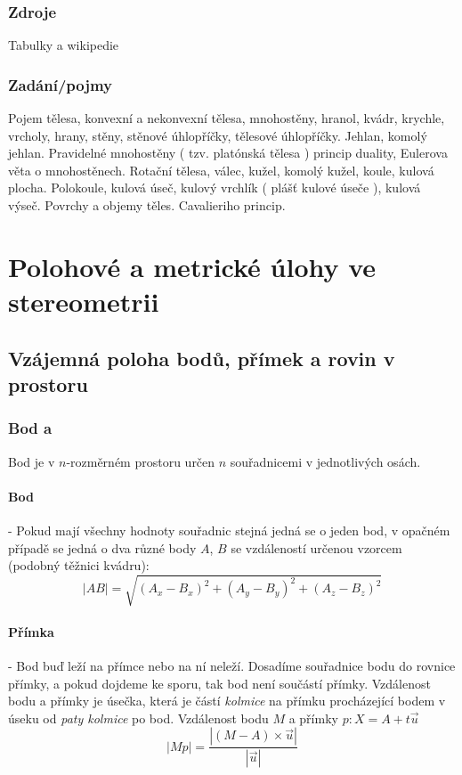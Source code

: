 \documentclass[12pt]{article}
\begin{document}
\subsubsection{Zdroje}
Tabulky a wikipedie	
\subsubsection{Zadání/pojmy}
Pojem tělesa, konvexní a nekonvexní tělesa, mnohostěny, hranol, kvádr, krychle, vrcholy, hrany, stěny, stěnové úhlopříčky, tělesové úhlopříčky. Jehlan, komolý jehlan. Pravidelné mnohostěny ( tzv. platónská tělesa ) princip duality, Eulerova věta o mnohostěnech. Rotační tělesa, válec, kužel, komolý kužel, koule, kulová plocha. Polokoule, kulová úseč, kulový vrchlík ( plášť kulové úseče ), kulová výseč. Povrchy a objemy těles. Cavalieriho princip.

\section{Polohové a metrické úlohy ve stereometrii}
\label{sec:18}
\subsection{Vzájemná poloha bodů, přímek a rovin v prostoru}
\label{sec:stereo_polohy}
\subsubsection{Bod a}
\label{sec:stereo_polohy-bod}
Bod je v $n$-rozměrném prostoru určen $n$ souřadnicemi v jednotlivých osách.
\paragraph{Bod} - Pokud mají všechny hodnoty souřadnic stejná jedná se o jeden bod, v opačném případě se jedná o dva různé body $A$, $B$ se vzdáleností určenou vzorcem (podobný těžnici kvádru):
\begin{equation}
\label{eq:vzdalenost_bodu}
|AB| = \sqrt{(A_x-B_x)^2 + (A_y-B_y)^2 + (A_z-B_z)^2}
\end{equation}
\paragraph{Přímka} - Bod buď leží na přímce nebo na ní neleží. Dosadíme souřadnice bodu do rovnice přímky, a pokud dojdeme ke sporu, tak bod není součástí přímky. Vzdálenost bodu a přímky je úsečka, která je částí \emph{kolmice} na přímku procházející bodem v úseku od \emph{paty kolmice} po bod. Vzdálenost bodu $M$ a přímky $p: X = A + t \vec{u}$
\begin{equation}
|Mp| = \frac{|(M-A)\times \vec{u}|}{|\vec{u}|}
\end{equation}
\end{document}
